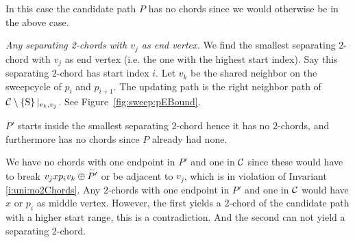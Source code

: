     In this case the candidate path $P$ has no chords since we would otherwise be in the above case.

    \emph{Any separating 2-chords with $v_j$ as end vertex.}
      We find the smallest separating 2-chord with $v_j$ as end vertex (i.e. the one with the highest start index). Say this separating $2$-chord has start index $i$.
      Let $v_k$ be the shared neighbor on the sweepcycle of $p_{i}$ and $p_{i +1}$. The updating path is the right neighbor path of $\mathcal{C} \setminus \left\lbrace {\mathrm{S}} \right\rbrace|_{v_k, v_j}$. See Figure~\ref{fig:sweep:pEBound}.

      $P'$ starts inside the smallest separating $2$-chord hence it has no $2$-chords, and furthermore has no chords since $P$ already had none.

      We have no chords with one endpoint in $P'$ and one in $\mathcal{C}$ since these would have to break $v_j x p_i v_k \oplus \accentset{\leftharpoonup}{P'}$ or be adjacent to $v_j$, which is in violation of Invariant \ref{i:uni:no2Chords}.
      Any $2$-chords with one endpoint in $P'$ and one in $\mathcal{C}$ would have $x$ or $p_i$ as middle vertex.
      However, the first yields a $2$-chord of the candidate path with a higher start range, this is a contradiction.
      And the second can not yield a separating $2$-chord. 


